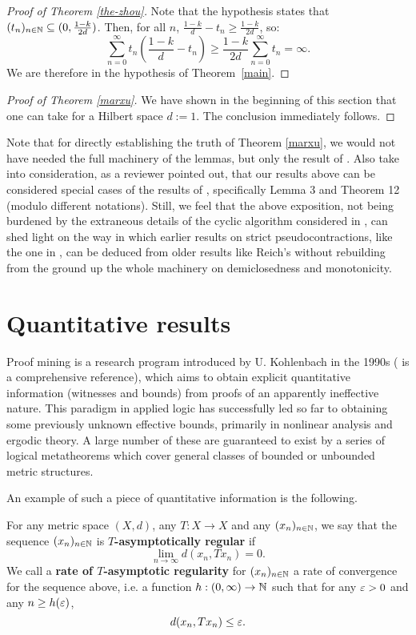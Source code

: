 \documentclass{article}
\begin{document}
\begin{proof}[Proof of Theorem \ref{the-zhou}]
Note that the hypothesis states that $(t_n)_{n \in {\mathbb N}} \subseteq (0,\frac{1-k}{2d})$. Then, for all $n$, $\frac{1-k}{d} - t_n \geq \frac{1-k}{2d}$, so:
$$\sum_{n=0}^\infty t_n\left(\frac{1-k}{d}-t_n\right) \geq \frac{1-k}{2d}\sum_{n=0}^\infty t_n = \infty.$$
We are therefore in the hypothesis of Theorem~\ref{main}.
\end{proof}

\begin{proof}[Proof of Theorem \ref{marxu}]
We have shown in the beginning of this section that one can take for a Hilbert space $d:=1$. The conclusion immediately follows.
\end{proof}

Note that for directly establishing the truth of Theorem \ref{marxu}, we would not have needed the full machinery of the lemmas, but only the result of \cite[Theorem 2]{BroPet67}. Also take into consideration, as a reviewer pointed out, that our results above can be considered special cases of the results of \cite{ColMar11}, specifically Lemma 3 and Theorem 12 (modulo different notations). Still, we feel that the above exposition, not being burdened by the extraneous details of the cyclic algorithm considered in \cite{ColMar11}, can shed light on the way in which earlier results on strict pseudocontractions, like the one in \cite{MarXu07}, can be deduced from older results like Reich's without rebuilding from the ground up the whole machinery on demiclosedness and monotonicity.

\section{Quantitative results}

Proof mining is a research program introduced by U. Kohlenbach in the 1990s (\cite{Koh08} is a comprehensive reference), which aims to obtain explicit quantitative information (witnesses and bounds) from proofs of an apparently ineffective nature. This paradigm in applied logic has successfully led so far to obtaining some previously unknown effective bounds, primarily in nonlinear analysis and ergodic theory. A large number of these are guaranteed to exist by a series of logical metatheorems which cover general classes of bounded or unbounded metric structures.

An example of such a piece of quantitative information is the following.

For any metric space $(X,d)$, any $T : X \to X$ and any $(x_n)_{n \in {\mathbb N}}$, we say that the sequence $(x_n)_{n \in {\mathbb N}}$ is {\bf $T$-asymptotically regular} if
$$\lim_{n \to \infty} d(x_n,Tx_n) = 0.$$
We call a {\bf rate of $T$-asymptotic regularity} for $(x_n)_{n \in {\mathbb N}}$ a rate of convergence for the sequence above, i.e. a function $h : (0, \infty) \to {\mathbb N}$ such that for any $\varepsilon >0$ and any $n \geq h(\varepsilon)$,
$$ d(x_n,Tx_n) \leq \varepsilon.$$
\end{document}
